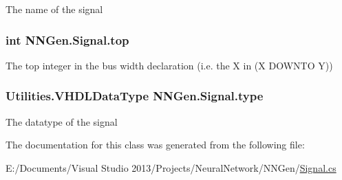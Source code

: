 The name of the signal 

\hypertarget{class_n_n_gen_1_1_signal_a0ba4a498e3bc647b39a2c100c7d8cd60}{}
\subsubsection[{top}]{\setlength{\rightskip}{0pt plus 5cm}int N\+N\+Gen.\+Signal.\+top\hspace{0.3cm}{\ttfamily [get]}}\label{class_n_n_gen_1_1_signal_a0ba4a498e3bc647b39a2c100c7d8cd60}


The top integer in the bus width declaration (i.\+e. the \textquotesingle{}X\textquotesingle{} in (X D\+O\+W\+N\+T\+O Y)) 

\hypertarget{class_n_n_gen_1_1_signal_a587998f4c25cb8bdaf5358e9f240c122}{}
\subsubsection[{type}]{\setlength{\rightskip}{0pt plus 5cm}Utilities.\+V\+H\+D\+L\+Data\+Type N\+N\+Gen.\+Signal.\+type\hspace{0.3cm}{\ttfamily [get]}}\label{class_n_n_gen_1_1_signal_a587998f4c25cb8bdaf5358e9f240c122}


The datatype of the signal 



The documentation for this class was generated from the following file\+:\begin{DoxyCompactItemize}
\item 
E\+:/\+Documents/\+Visual Studio 2013/\+Projects/\+Neural\+Network/\+N\+N\+Gen/\hyperlink{_signal_8cs}{Signal.\+cs}\end{DoxyCompactItemize}
